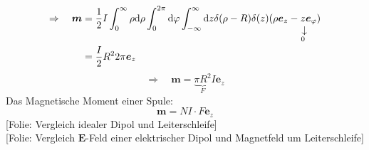 \documentclass[titlepage,11pt,a4paper,ngerman]{report}
\newcommand{\tx}[1]{\textrm{#1}}
\newcommand{\ub}[1]{\underbrace{#1}}
\newcommand{\dd}{\tx{d}}
\newcommand{\custo}[3]{\underset{\scriptstyle\overset{\mkern4mu\rotatebox{-90}{$\,#1$}}{#3}}{#2}}
\newcommand{\folie}[1]{\color{gray}[Folie: #1]\color{black}}
\renewcommand{\vec}[1]{\boldsymbol{#1}}
\begin{document}
\begin{align*}
\Rightarrow \quad \vec{m} &= \frac{1}{2} I \int_{0}^{\infty} \rho \dd \rho \int_{0}^{2 \pi} \dd \varphi \int_{-\infty}^{\infty} \dd z \delta(\rho - R) \delta(z) (\rho \vec{e}_z - \custo{\rightarrow}{z}{0} \vec{e}_{\varphi})\\
&= \frac{I}{2} R^2 2 \pi \vec{e}_z
\end{align*}
\begin{equation*}
\Rightarrow \quad \vec{m} = \ub{\pi R^2}_{F} I \vec{e}_z
\end{equation*}
%
%
Das Magnetische Moment einer Spule:
%
%
\begin{equation*}
\vec{m} = N I \cdot F \vec{e}_z
\end{equation*}
\folie{Vergleich idealer Dipol und Leiterschleife}\\
\folie{Vergleich $ \vec{E} $-Feld einer elektrischer Dipol und Magnetfeld um Leiterschleife}
\end{document}
